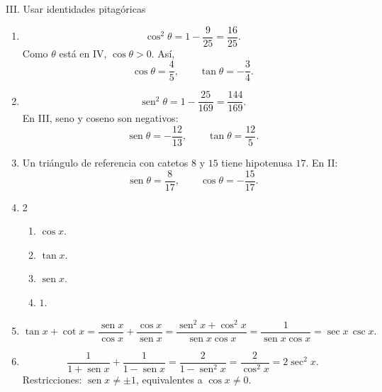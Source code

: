 \documentclass[letterpaper,12pt]{article}
\newcommand{\seno}{\operatorname{sen}}
\begin{document}
\begin{solbox}{III. Usar identidades pitagóricas}
\begin{enumerate}[label=\color{azulFuerte}\textbf{\arabic*.},leftmargin=*,start=15]
    \item
    \[
    \cos^2\theta=1-\frac9{25}=\frac{16}{25}.
    \]
    Como \(\theta\) está en IV, \(\cos\theta>0\). Así,
    \[
        \cos\theta=\frac45,\qquad \tan\theta=-\frac34.
    \]

    \item
    \[
    \seno^2\theta=1-\frac{25}{169}=\frac{144}{169}.
    \]
    En III, seno y coseno son negativos:
    \[
        \seno\theta=-\frac{12}{13},\qquad \tan\theta=\frac{12}{5}.
    \]

    \item Un triángulo de referencia con catetos \(8\) y \(15\) tiene hipotenusa \(17\). En II:
    \[
        \seno\theta=\frac8{17},\qquad \cos\theta=-\frac{15}{17}.
    \]

    \item
    \begin{multicols}{2}
    \begin{enumerate}[label=\alph*),leftmargin=*]
        \item \(\cos x\).
        \item \(\tan x\).
        \item \(\seno x\).
        \item \(1\).
    \end{enumerate}
    \end{multicols}

    \item
    \[
    \tan x+\cot x
    =\frac{\seno x}{\cos x}+\frac{\cos x}{\seno x}
    =\frac{\seno^2x+\cos^2x}{\seno x\cos x}
    =\frac1{\seno x\cos x}
    =\sec x\,\csc x.
    \]

    \item
    \[
    \frac{1}{1+\seno x}+\frac{1}{1-\seno x}
    =\frac{2}{1-\seno^2x}
    =\frac{2}{\cos^2x}
    =2\sec^2x.
    \]
    Restricciones: \(\seno x\neq\pm1\), equivalentes a \(\cos x\neq0\).
\end{enumerate}
\end{solbox}
\end{document}
